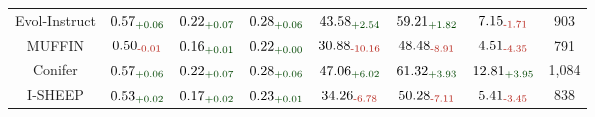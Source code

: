 \begin{table*}[!ht]
{\begin{tabular}{c|ccc|cc|cc}
Evol-Instruct & $\text{0.57}_{\textcolor{deepgreen}{\text{+0.06}}}$ & $\text{0.22}_{\textcolor{deepgreen}{\text{+0.07}}}$ & $\text{0.28}_{\textcolor{deepgreen}{\text{+0.06}}}$ & $\text{43.58}_{\textcolor{deepgreen}{\text{+2.54}}}$ & $\text{59.21}_{\textcolor{deepgreen}{\text{+1.82}}}$ & $\text{7.15}_{\textcolor{deepred}{\text{-1.71}}}$ &  903         \\
MUFFIN & $\text{0.50}_{\textcolor{deepred}{\text{-0.01}}}$ & $\text{0.16}_{\textcolor{deepgreen}{\text{+0.01}}}$ & $\text{0.22}_{\textcolor{deepgreen}{\text{+0.00}}}$ & $\text{30.88}_{\textcolor{deepred}{\text{-10.16}}}$ & $\text{48.48}_{\textcolor{deepred}{\text{-8.91}}}$ & $\text{4.51}_{\textcolor{deepred}{\text{-4.35}}}$ &  791                  \\
Conifer & $\text{0.57}_{\textcolor{deepgreen}{\text{+0.06}}}$ & $\text{0.22}_{\textcolor{deepgreen}{\text{+0.07}}}$ & $\text{0.28}_{\textcolor{deepgreen}{\text{+0.06}}}$ & $\text{47.06}_{\textcolor{deepgreen}{\text{+6.02}}}$ & $\text{61.32}_{\textcolor{deepgreen}{\text{+3.93}}}$ & $\text{12.81}_{\textcolor{deepgreen}{\text{+3.95}}}$ &  1,084                 \\
I-SHEEP & $\text{0.53}_{\textcolor{deepgreen}{\text{+0.02}}}$ & $\text{0.17}_{\textcolor{deepgreen}{\text{+0.02}}}$ & $\text{0.23}_{\textcolor{deepgreen}{\text{+0.01}}}$ & $\text{34.26}_{\textcolor{deepred}{\text{-6.78}}}$ & $\text{50.28}_{\textcolor{deepred}{\text{-7.11}}}$ & $\text{5.41}_{\textcolor{deepred}{\text{-3.45}}}$ &  838                  \\
\midrule



\end{tabular}}
\end{table*}
